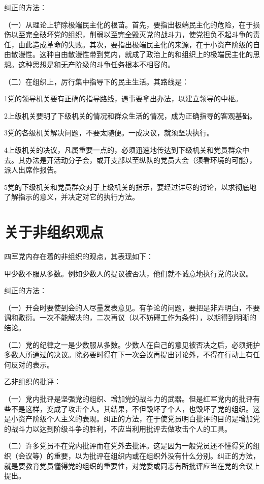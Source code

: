 纠正的方法：

（一）从理论上铲除极端民主化的根苗。首先，要指出极端民主化的危险，在于损伤以至完全破坏党的组织，削弱以至完全毁灭党的战斗力，使党担负不起斗争的责任，由此造成革命的失败。其次，要指出极端民主化的来源，在于小资产阶级的自由散漫性。这种自由散漫性带到党内，就成了政治上的和组织上的极端民主化的思想。这种思想是和无产阶级的斗争任务根本不相容的。

（二）在组织上，厉行集中指导下的民主生活。其路线是：

1党的领导机关要有正确的指导路线，遇事要拿出办法，以建立领导的中枢。

2上级机关要明了下级机关的情况和群众生活的情况，成为正确指导的客观基础。

3党的各级机关解决问题，不要太随便。一成决议，就须坚决执行。

4上级机关的决议，凡属重要一点的，必须迅速地传达到下级机关和党员群众中去。其办法是开活动分子会，或开支部以至纵队的党员大会（须看环境的可能），派人出席作报告。

5党的下级机关和党员群众对于上级机关的指示，要经过详尽的讨论，以求彻底地了解指示的意义，并决定对它的执行方法。

\section{关于非组织观点}

四军党内存在着的非组织的观点，其表现如下：

甲少数不服从多数。例如少数人的提议被否决，他们就不诚意地执行党的决议。

纠正的方法：

（一）开会时要使到会的人尽量发表意见。有争论的问题，要把是非弄明白，不要调和敷衍。一次不能解决的，二次再议（以不妨碍工作为条件），以期得到明晰的结论。

（二）党的纪律之一是少数服从多数。少数人在自己的意见被否决之后，必须拥护多数人所通过的决议。除必要时得在下一次会议再提出讨论外，不得在行动上有任何反对的表示。

乙非组织的批评：

（一）党内批评是坚强党的组织、增加党的战斗力的武器。但是红军党内的批评有些不是这样，变成了攻击个人。其结果，不但毁坏了个人，也毁坏了党的组织。这是小资产阶级个人主义的表现。纠正的方法，在于使党员明白批评的目的是增加党的战斗力以达到阶级斗争的胜利，不应当利用批评去做攻击个人的工具。

（二）许多党员不在党内批评而在党外去批评。这是因为一般党员还不懂得党的组织（会议等）的重要，以为批评在组织内或在组织外没有什么分别。纠正的方法，就是要教育党员懂得党的组织的重要性，对党委或同志有所批评应当在党的会议上提出。


